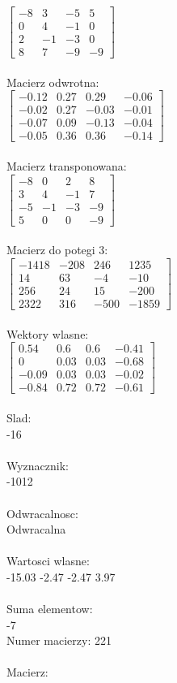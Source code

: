\documentclass[a4paper,12pt]{article}
\begin{document}
$\begin{bmatrix} -8&3&-5&5\\0&4&-1&0\\2&-1&-3&0\\8&7&-9&-9 \end{bmatrix}$
\\
\\
Macierz odwrotna:\\

$\begin{bmatrix} -0.12&0.27&0.29&-0.06\\-0.02&0.27&-0.03&-0.01\\-0.07&0.09&-0.13&-0.04\\-0.05&0.36&0.36&-0.14 \end{bmatrix}$
\\
\\
Macierz transponowana:\\

$\begin{bmatrix} -8&0&2&8\\3&4&-1&7\\-5&-1&-3&-9\\5&0&0&-9 \end{bmatrix}$
\\
\\
Macierz do potegi 3:\\

$\begin{bmatrix} -1418&-208&246&1235\\14&63&-4&-10\\256&24&15&-200\\2322&316&-500&-1859 \end{bmatrix}$
\\
\\
Wektory wlasne:\\

$\begin{bmatrix} 0.54&0.6&0.6&-0.41\\0&0.03&0.03&-0.68\\-0.09&0.03&0.03&-0.02\\-0.84&0.72&0.72&-0.61 \end{bmatrix}$
\\
\\
Slad:\\
-16
\\
\\
Wyznacznik:\\
-1012
\\
\\
Odwracalnosc:\\
Odwracalna
\\
\\
Wartosci wlasne:\\
-15.03 -2.47 -2.47 3.97
\\
\\
Suma elementow:\\
-7
\\
\newpage
Numer macierzy:
221
\\
\\
Macierz:\\
\end{document}
